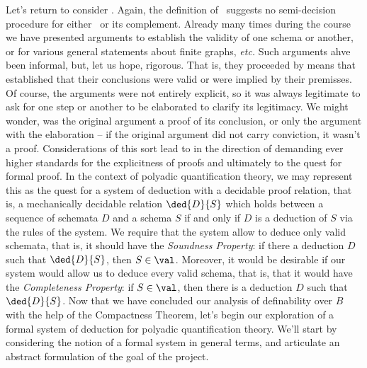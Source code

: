 Let's return to consider \val. Again, the definition of \val\ suggests no semi-decision procedure for either \val\ or its complement. Already many times during the course we have presented arguments to establish the validity of one schema or another, or for various general statements about finite graphs, \emph{etc.} Such arguments ahve been informal, but, let us hope, rigorous. That is, they proceeded by means that established  that their conclusions were valid or were implied by their premisses. Of course, the arguments were not entirely explicit, so it was always legitimate to ask for one step or another to be elaborated to clarify its legitimacy. We might wonder, was the original argument a proof of its conclusion, or only the argument with the elaboration -- if the original argument did not carry conviction, it wasn't a proof. Considerations of this sort lead to in the direction of demanding ever higher standards for the explicitness of proofs and ultimately to the quest for formal proof. In the context of polyadic quantification theory, we may represent this as the quest for a system of deduction with a decidable proof relation, that is, a mechanically decidable relation $\ded{D}{S}$ which holds between a sequence of schemata $D$ and a schema $S$ if and only if $D$ is a deduction of $S$ via the rules of the system. We require that the system allow to deduce only valid schemata, that is, it should have the \emph{Soundness Property}: if there a deduction $D$ such that $\ded{D}{S}$, then $S\in\val$. Moreover, it would be desirable if our system would allow us to deduce every valid schema, that is, that it would have the \emph{Completeness Property}: if $S\in\val$, then there is a deduction $D$ such that $\ded{D}{S}$. 
\fi 
\iffalse
Now that we have concluded our analysis of definability over $B$ with the help of the Compactness Theorem, let's begin our exploration of a formal system of deduction for polyadic quantification theory. We'll start by considering the notion of a formal system in general terms, and articulate an abstract formulation of the goal of the project.

